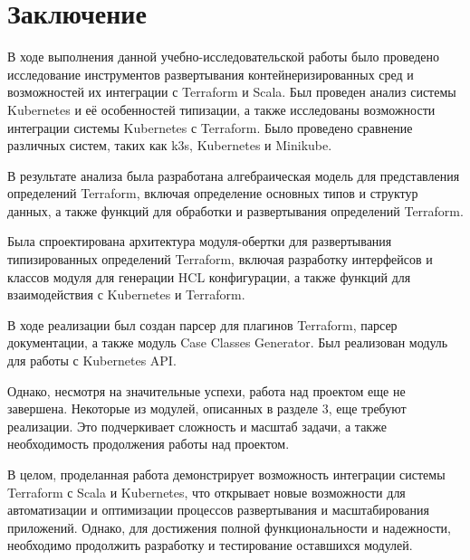 \chapter*{Заключение}

В ходе выполнения данной учебно-исследовательской работы было проведено
исследование инструментов развертывания контейнеризированных сред и возможностей
их интеграции с Terraform и Scala. Был проведен анализ системы Kubernetes и её
особенностей типизации, а также исследованы возможности интеграции системы
Kubernetes с Terraform. Было проведено сравнение различных систем, таких как
k3s, Kubernetes и Minikube.

В результате анализа была разработана алгебраическая модель для представления
определений Terraform, включая определение основных типов и структур данных, а
также функций для обработки и развертывания определений Terraform.

Была спроектирована архитектура модуля-обертки для развертывания типизированных
определений Terraform, включая разработку интерфейсов и классов модуля для
генерации HCL конфигурации, а также функций для взаимодействия с Kubernetes и
Terraform.

В ходе реализации был создан парсер для плагинов Terraform, парсер документации,
а также модуль Case Classes Generator. Был реализован модуль для работы с
Kubernetes API.

Однако, несмотря на значительные успехи, работа над проектом еще не завершена.
Некоторые из модулей, описанных в разделе 3, еще требуют реализации. Это
подчеркивает сложность и масштаб задачи, а также необходимость продолжения
работы над проектом.

В целом, проделанная работа демонстрирует возможность интеграции системы
Terraform с Scala и Kubernetes, что открывает новые возможности для
автоматизации и оптимизации процессов развертывания и масштабирования
приложений. Однако, для достижения полной функциональности и надежности,
необходимо продолжить разработку и тестирование оставшихся модулей.
